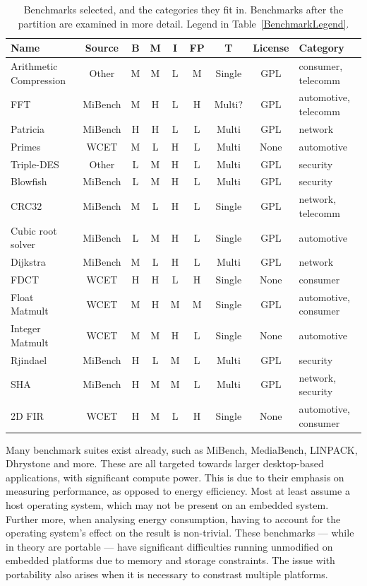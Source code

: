 \documentclass[twocolumn]{article}
\begin{document}
\begin{table}[th!]
\centering
	\begin{tabular}{l c c c c c c c l}
	Name				 	& Source 	& B & M & I & FP& T 		& License & Category \\
	\hline
	Arithmetic Compression	& Other		& M & M & L & M & Single 	& GPL	& consumer, telecomm	\\
	FFT						& MiBench 	& M & H & L & H & Multi?	&  GPL	& automotive, telecomm	\\
	Patricia				& MiBench 	& H & H & L & L & Multi 	& GPL	& network	\\
	Primes					& WCET 		& M & L & H & L & Multi 	& None	& automotive	\\
	Triple-DES				& Other	 	& L & M & H & L & Multi 	& GPL	& security	\\
	\hline
	Blowfish				& MiBench 	& L & M & H & L & Multi 	& GPL	& security	\\
	CRC32					& MiBench 	& M & L & H & L & Single 	& GPL	& network, telecomm	\\
	Cubic root solver		& MiBench 	& L & M & H & L & Single 	& GPL	& automotive	\\
	Dijkstra				& MiBench 	& M & L & H & L & Multi 	& GPL	& network	\\
	FDCT					& WCET 		& H & H & L & H & Single 	& None	& consumer	\\
	Float Matmult			& WCET 		& M & H & M & M & Single 	& GPL	& automotive, consumer	\\
	Integer Matmult			& WCET	 	& M & M & H & L & Single 	& None	& automotive	\\
	Rjindael				& MiBench 	& H & L & M & L & Multi 	& GPL	& security	\\
	SHA						& MiBench 	& H & M & M & L & Multi 	& GPL	& network, security	\\
	2D FIR					& WCET 		& H & M & L & H & Single 	& None	& automotive, consumer	\\
	\end{tabular}
\caption{Benchmarks selected, and the categories they fit in. Benchmarks after the partition are examined in more detail. Legend in Table~\ref{BenchmarkLegend}.}
\label{Table:BenchmarkTable}
\end{table}

Many benchmark suites exist already, such as MiBench\cite{Guthaus2001}, MediaBench\cite{Fritts2009}, LINPACK\cite{Dongarra2003}, Dhrystone\cite{Weicker1988} and more. These are all targeted towards larger desktop-based applications, with significant compute power. This is due to their emphasis on measuring performance, as opposed to energy efficiency. Most at least assume a host operating system, which may not be present on an embedded system. Further more, when analysing energy consumption, having to account for the operating system’s effect on the result is non-trivial. These benchmarks --- while in theory are portable --- have significant difficulties running unmodified on embedded platforms due to memory and storage constraints. The issue with portability also arises when it is necessary to constrast multiple platforms.
\end{document}
